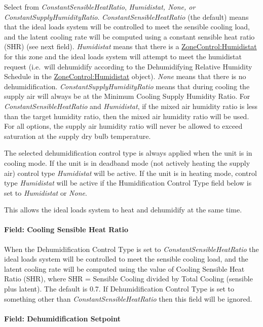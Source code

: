 Select from \emph{ConstantSensibleHeatRatio}, \emph{Humidistat, None, or ConstantSupplyHumidityRatio}. \emph{ConstantSensibleHeatRatio} (the default) means that the ideal loads system will be controlled to meet the sensible cooling load, and the latent cooling rate will be computed using a constant sensible heat ratio (SHR) (see next field). \emph{Humidistat} means that there is a \hyperref[zonecontrolhumidistat]{ZoneControl:Humidistat} for this zone and the ideal loads system will attempt to meet the humidistat request (i.e.~will dehumidify according to the Dehumidifying Relative Humidity Schedule in the \hyperref[zonecontrolhumidistat]{ZoneControl:Humidistat} object). \emph{None} means that there is no dehumidification. \emph{ConstantSupplyHumidityRatio} means that during cooling the supply air will always be at the Minimum Cooling Supply Humidity Ratio. For \emph{ConstantSensibleHeatRatio} and \emph{Humidistat}, if the mixed air humidity ratio is less than the target humidity ratio, then the mixed air humidity ratio will be used. For all options, the supply air humidity ratio will never be allowed to exceed saturation at the supply dry bulb temperature.

The selected dehumidification control type is always applied when the unit is in cooling mode. If the unit is in deadband mode (not actively heating the supply air) control type \emph{Humidistat} will be active. If the unit is in heating mode, control type \emph{Humidistat} will be active if the Humidification Control Type field below is set to \emph{Humidistat} or \emph{None}.

This allows the ideal loads system to heat and dehumidify at the same time.

\paragraph{Field: Cooling Sensible Heat Ratio}\label{field-cooling-sensible-heat-ratio}

When the Dehumidification Control Type is set to \emph{ConstantSensibleHeatRatio} the ideal loads system will be controlled to meet the sensible cooling load, and the latent cooling rate will be computed using the value of Cooling Sensible Heat Ratio (SHR), where SHR = Sensible Cooling divided by Total Cooling (sensible plus latent). The default is 0.7. If Dehumidification Control Type is set to something other than \emph{ConstantSensibleHeatRatio} then this field will be ignored.

\paragraph{Field: Dehumidification Setpoint}\label{field-dehumidification-setpoint}


